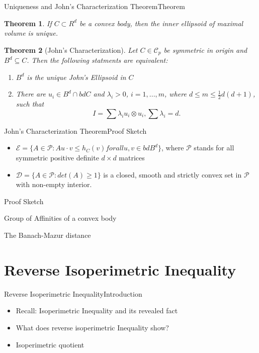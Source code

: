 \documentclass[
  english,            %
  aspectratio=169,    %
]{tumbeamer}
\newtheorem{theorem}{Theorem}
\begin{document}
\begin{frame}{Uniqueness and John's Characterization Theorem}{Theorem}
\centering
\begin{theorem}
  If $C \subset R^{d}$ be a convex body, then the inner ellipsoid of maximal volume is unique.
\end{theorem}
\begin{theorem}[John's Characterization]
  Let $C \in \mathcal{C}_{p}$ be symmetric in origin and $B^{d} \subseteq C$. Then the following statments are equivalent:
  \begin{enumerate}[label=(\roman*)]
    \item $B^{d}$ is the unique John's Ellipsoid in $C$
    \item There are $u_{i} \in B^{d}\cap bdC$ and $\lambda_{i}>0$, $i=1,...,m$, where $d\leq m\leq \frac{1}{2}d(d+1)$, such that
    \[
      I=\sum\lambda_{i}u_{i}\otimes u_{i}, \sum \lambda_{i}=d.
    \]
  \end{enumerate}
\end{theorem}
\end{frame}

\begin{frame}{John's Characterization Theorem}{Proof Sketch}
  \begin{itemize}
    \item $\mathcal{E}=\{A\in \mathcal{P}: Au\cdot v\leq h_{C}(v) for all u,v \in bd B^{d}\}$, where $\mathcal{P}$ stands for all symmetric positive definite $d\times d$ matrices  
    \item $\mathcal{D}=\{A\in \mathcal{P}: det(A)\geq 1\}$ is a closed, smooth and strictly convex set in $\mathcal{P}$ with non-empty interior.
  \end{itemize}

\end{frame}

\begin{frame}{Proof Sketch}

\end{frame}

\begin{frame}{Group of Affinities of a convex body}

\end{frame}

\begin{frame}{The Banach-Mazur distance}

\end{frame}

\section{Reverse Isoperimetric Inequality}
\begin{frame}{Reverse Isoperimetric Inequality}{Introduction}
  \begin{itemize}
    \item Recall: Isoperimetric Inequality and its revealed fact
    \item What does reverse isoperimetric Inequality show?
    \item Isoperimetric quotient
  \end{itemize}
\end{frame}
\end{document}
